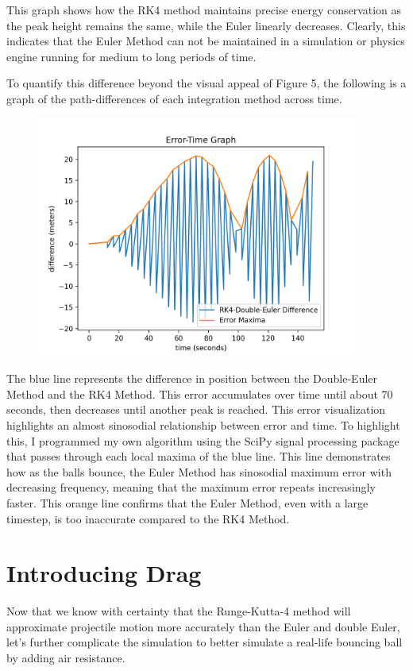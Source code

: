 \documentclass[12pt]{article}
\begin{document}
This graph shows how the RK4 method maintains precise energy conservation as the peak height remains the same, while the Euler linearly decreases. Clearly, this indicates that the Euler Method can not be maintained in a simulation or physics engine running for medium to long periods of time.

To quantify this difference beyond the visual appeal of Figure 5, the following is a graph of the path-differences of each integration method across time. 

\begin{figure}[H]
\centering
\includegraphics[width=300pt]{img/long_error.png}
\caption{\label{fig:1}}
\end{figure}

The blue line represents the difference in position between the Double-Euler Method and the RK4 Method. This error accumulates over time until about 70 seconds, then decreases until another peak is reached. This error visualization highlights an almost sinosodial relationship between error and time. To highlight this, I programmed my own algorithm using the SciPy signal processing package that passes through each local maxima of the blue line. This line demonstrates how as the balls bounce, the Euler Method has sinosodial maximum error with decreasing frequency, meaning that the maximum error repeats increasingly faster. This orange line confirms that the Euler Method, even with a large timestep, is too inaccurate compared to the RK4 Method.

\section{Introducing Drag} 

Now that we know with certainty that the Runge-Kutta-4 method will approximate projectile motion more accurately than the Euler and double Euler, let's further complicate the simulation to better simulate a real-life bouncing ball by adding air resistance.
\end{document}
